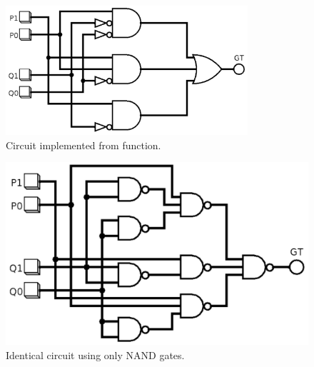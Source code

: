 \documentclass{article}
\begin{document}
\begin{figure}[hbtp]
  \centering
  \includegraphics[width=0.8\textwidth]{circuit}
  \caption{\label{fig:circuit} Circuit implemented from function.}
\end{figure}

\begin{figure}[hbtp]
  \centering
  \includegraphics[width=\textwidth]{circuit_nand}
  \caption{\label{fig:circuit_nand} Identical circuit using only NAND gates.}
\end{figure}
\end{document}
